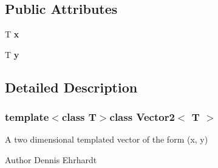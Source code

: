 \subsection*{Public Attributes}
\begin{DoxyCompactItemize}
\item 
\hypertarget{classVector2_a78fa1f2ed5e261c7fbeb8f3536a1ee34}{T {\bfseries x}}\label{classVector2_a78fa1f2ed5e261c7fbeb8f3536a1ee34}

\item 
\hypertarget{classVector2_a6cfed8355591aa269f4dba43bd806ef9}{T {\bfseries y}}\label{classVector2_a6cfed8355591aa269f4dba43bd806ef9}

\end{DoxyCompactItemize}


\subsection{Detailed Description}
\subsubsection*{template$<$class T$>$class Vector2$<$ T $>$}

A two dimensional templated vector of the form (x, y) 

\begin{DoxyAuthor}{Author}
Dennis Ehrhardt 
\end{DoxyAuthor}



